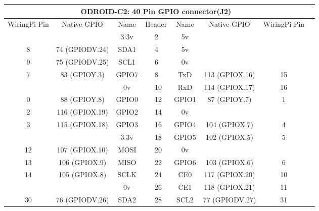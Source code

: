 \documentclass[12pt,a4paper]{article}
\begin{document}
\begin{sffamily}
\begin{center}
\begin{tabular}{|c|c|c||p{8mm}|p{8mm}||c|c|c|c|}
\hline
\multicolumn{8}{|c|}{\bfseries{ODROID-C2: 40 Pin GPIO connector(J2)}}\\
\hline
\hline
WiringPi Pin	& Native GPIO	& Name	& \multicolumn{2}{|c||}{Header}	& Name	& Native GPIO	& WiringPi Pin\\
\hline
\hline
	& 		& \textcolor{rtb-red}{3.3v}	& \raggedleft{1} &  2 & \textcolor{rtb-maroon}{5v}	& 		& \\
\hline
8	& 74 (GPIODV.24)& \textcolor{rtb-aqua}{SDA1}	& \raggedleft{3} &  4 & \textcolor{rtb-maroon}{5v}	& 		& \\
\hline
9	& 75 (GPIODV.25)& \textcolor{rtb-aqua}{SCL1}	& \raggedleft{5} &  6 & \textcolor{rtb-black}{0v}	& 		& \\
\hline
7	& 83 (GPIOY.3)	& \textcolor{rtb-green}{GPIO7}	& \raggedleft{7} &  8 & \textcolor{rtb-yellow}{TxD}	& 113 (GPIOX.16)& 15\\
\hline
	& 		& \textcolor{rtb-black}{0v}	& \raggedleft{9} & 10 & \textcolor{rtb-yellow}{RxD}	& 114 (GPIOX.17)& 16\\
\hline
0	& 88 (GPIOY.8)	& \textcolor{rtb-green}{GPIO0}	& \raggedleft{11} & 12 & \textcolor{rtb-green}{GPIO1}	& 87 (GPIOY.7)	& 1\\
\hline
2	& 116 (GPIOX.19)& \textcolor{rtb-green}{GPIO2}	& \raggedleft{13} & 14 & \textcolor{rtb-black}{0v}	& 		& \\
\hline
3	& 115 (GPIOX.18)& \textcolor{rtb-green}{GPIO3}	& \raggedleft{15} & 16 & \textcolor{rtb-green}{GPIO4}	& 104 (GPIOX.7)	& 4\\
\hline
	& 		& \textcolor{rtb-red}{3.3v}	& \raggedleft{17} & 18 & \textcolor{rtb-green}{GPIO5}	& 102 (GPIOX.5)	& 5\\
\hline
12	& 107 (GPIOX.10)& \textcolor{rtb-teal}{MOSI}	& \raggedleft{19} & 20 & \textcolor{rtb-black}{0v}	& 		& \\
\hline
13	& 106 (GPIOX.9)	& \textcolor{rtb-teal}{MISO}	& \raggedleft{21} & 22 & \textcolor{rtb-green}{GPIO6}	& 103 (GPIOX.6)	& 6\\
\hline
14	& 105 (GPIOX.8)	& \textcolor{rtb-teal}{SCLK}	& \raggedleft{23} & 24 & \textcolor{rtb-teal}{CE0}	& 117 (GPIOX.20)& 10\\
\hline
	& 		& \textcolor{rtb-black}{0v}	& \raggedleft{25} & 26 & \textcolor{rtb-teal}{CE1}	& 118 (GPIOX.21)& 11\\
\hline
30	& 76 (GPIODV.26)& \textcolor{rtb-green}{SDA2}	& \raggedleft{27} & 28 & \textcolor{rtb-green}{SCL2}	& 77 (GPIODV.27)& 31\\

\end{tabular}
\end{center}
\end{sffamily}
\end{document}
